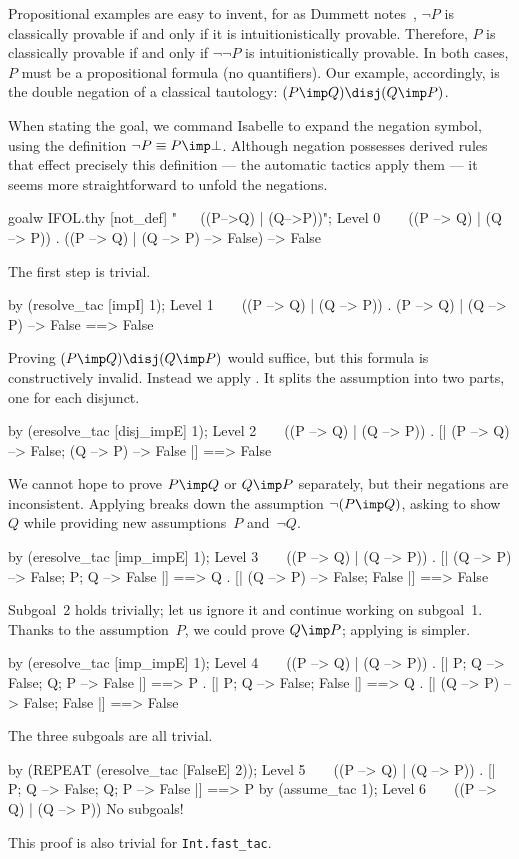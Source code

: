Propositional examples are easy to invent, for as Dummett notes~\cite[page
28]{dummett}, $\neg P$ is classically provable if and only if it is
intuitionistically provable.  Therefore, $P$ is classically provable if and
only if $\neg\neg P$ is intuitionistically provable.  In both cases, $P$
must be a propositional formula (no quantifiers).  Our example,
accordingly, is the double negation of a classical tautology: $(P\imp
Q)\disj (Q\imp P)$.

When stating the goal, we command Isabelle to expand the negation symbol,
using the definition $\neg P\equiv P\imp\bot$.  Although negation possesses
derived rules that effect precisely this definition --- the automatic
tactics apply them --- it seems more straightforward to unfold the
negations.
\begin{ttbox}
goalw IFOL.thy [not_def] "~ ~ ((P-->Q) | (Q-->P))";
{\out Level 0}
{\out ~ ~ ((P --> Q) | (Q --> P))}
{. ((P --> Q) | (Q --> P) --> False) --> False}
\end{ttbox}
The first step is trivial.
\begin{ttbox}
by (resolve_tac [impI] 1);
{\out Level 1}
{\out ~ ~ ((P --> Q) | (Q --> P))}
{. (P --> Q) | (Q --> P) --> False ==> False}
\end{ttbox}
Proving $(P\imp Q)\disj (Q\imp P)$ would suffice, but this formula is
constructively invalid.  Instead we apply .  It splits
the assumption into two parts, one for each disjunct.
\begin{ttbox}
by (eresolve_tac [disj_impE] 1);
{\out Level 2}
{\out ~ ~ ((P --> Q) | (Q --> P))}
{. [| (P --> Q) --> False; (Q --> P) --> False |] ==> False}
\end{ttbox}
We cannot hope to prove $P\imp Q$ or $Q\imp P$ separately, but
their negations are inconsistent.  Applying  breaks down
the assumption $\neg(P\imp Q)$, asking to show~$Q$ while providing new
assumptions~$P$ and~$\neg Q$.
\begin{ttbox}
by (eresolve_tac [imp_impE] 1);
{\out Level 3}
{\out ~ ~ ((P --> Q) | (Q --> P))}
{. [| (Q --> P) --> False; P; Q --> False |] ==> Q}
{. [| (Q --> P) --> False; False |] ==> False}
\end{ttbox}
Subgoal~2 holds trivially; let us ignore it and continue working on
subgoal~1.  Thanks to the assumption~$P$, we could prove $Q\imp P$;
applying  is simpler.
\begin{ttbox}
by (eresolve_tac [imp_impE] 1);
{\out Level 4}
{\out ~ ~ ((P --> Q) | (Q --> P))}
{. [| P; Q --> False; Q; P --> False |] ==> P}
{. [| P; Q --> False; False |] ==> Q}
{. [| (Q --> P) --> False; False |] ==> False}
\end{ttbox}
The three subgoals are all trivial.
\begin{ttbox}
by (REPEAT (eresolve_tac [FalseE] 2));
{\out Level 5}
{\out ~ ~ ((P --> Q) | (Q --> P))}
{. [| P; Q --> False; Q; P --> False |] ==> P}
by (assume_tac 1);
{\out Level 6}
{\out ~ ~ ((P --> Q) | (Q --> P))}
{\out No subgoals!}
\end{ttbox}
This proof is also trivial for {\tt Int.fast_tac}.


